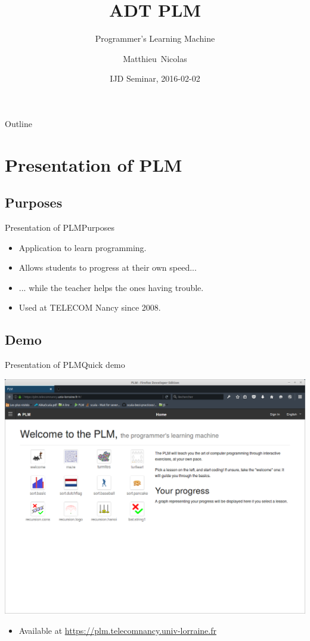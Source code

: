 \documentclass{beamer}
\title{ADT PLM}
\subtitle{Programmer's Learning Machine}
\author{Matthieu~Nicolas}
\date{IJD Seminar, 2016-02-02}
\begin{document}
\begin{frame}
  \titlepage
\end{frame}

\begin{frame}{Outline}
  \tableofcontents
\end{frame}

\section{Presentation of PLM}

\subsection{Purposes}

\begin{frame}{Presentation of PLM}{Purposes}
  \begin{itemize}
  \item {
    Application to learn programming.
    \pause
  }
  \item {
    Allows students to progress at their own speed...
    \pause
  }
  \item {
    ... while the teacher helps the ones having trouble.
    \pause
  }
  \item {
    Used at TELECOM Nancy since 2008.
  }
  \end{itemize}
\end{frame}

\subsection{Demo}

\begin{frame}{Presentation of PLM}{Quick demo}
  \begin{center}
    \href{https://plm.telecomnancy.univ-lorraine.fr}{\includegraphics[scale=0.16]{img/screen-webPLM-1.png}}
    \begin{itemize}
    \item Available at \url{https://plm.telecomnancy.univ-lorraine.fr}
    \end{itemize}
  \end{center}
\end{frame}
\end{document}
